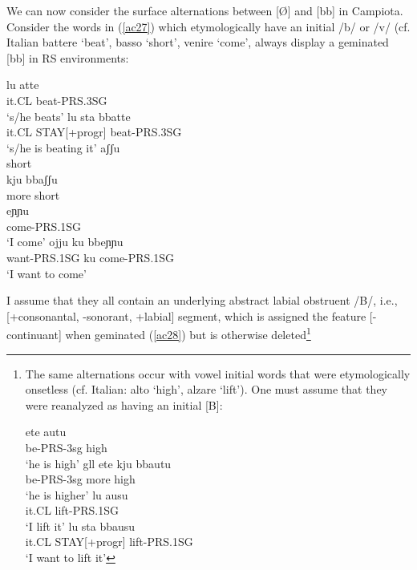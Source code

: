 \documentclass[output=paper]{langscibook}
\begin{document}
We can now consider the surface alternations between [Ø] and [bb] in Campiota.  Consider the words in (\ref{ac27}) which etymologically have an initial /b/ or /v/ (cf. Italian battere ‘beat’, basso ‘short’, venire ‘come’, always display a geminated [bb] in RS environments:

\ea\label{ac27}
    \ea\label{ac27a}
        \ea \label{ac27ai}\gll lu atte\\
            it.CL beat-PRS.3SG\\  
            \glt `s/he beats'  
        \ex \label{ac27aii}\gll lu   sta     bbatte\\
            it.CL STAY[+progr] beat-PRS.3SG\\
            \glt `s/he is beating it'
        \z
    \ex\label{ac27b}
        \ea \label{ac27bi}\gll aʃʃu\\
                short\\
        \ex \label{ac27bii}\gll kju     bbaʃʃu\\
                more    short\\
        \z
    \ex\label{ac27c}
        \ea \label{ac27ci}\gll eɲɲu\\
            come-PRS.1SG\\ 
            \glt `I come'   
        \ex \label{ac27cii}\gll ojju      ku   bbeɲɲu\\
            want-PRS.1SG ku   come-PRS.1SG\\
            \glt `I want to come' 
        \z
    \z
\z

I assume that they all contain an underlying abstract labial obstruent /B/, i.e., [+consonantal, -sonorant, +labial] segment, which is assigned the feature [-continuant] when geminated (\ref{ac28}) but is otherwise deleted\footnote{The same alternations occur with vowel initial words that were etymologically onsetless (cf. Italian: alto `high', alzare `lift').  One must assume that they were reanalyzed as having an initial [B]:

\ea \label{fn14ex}
    \ea \label{fn14exa}
        \ea \label{fn14exai}\gll ete autu\\
            be-PRS-3sg high\\
            \glt ‘he is high’    
        \ex \label{fn14exaii}gll ete kju bbautu\\
            be-PRS-3sg more high\\
            \glt ‘he is higher’
        \z
    \ex \label{fn14exb}
        \ea \label{fn14exbi}\gll lu ausu\\
            it.CL lift-PRS.1SG\\
            \glt ‘I lift it’  
        \ex \label{fn14exbii}\gll lu sta bbausu\\
            it.CL STAY[+progr]  lift-PRS.1SG\\
            \glt ‘I want to lift it’
        \z
    \z
\z

}
\end{document}
